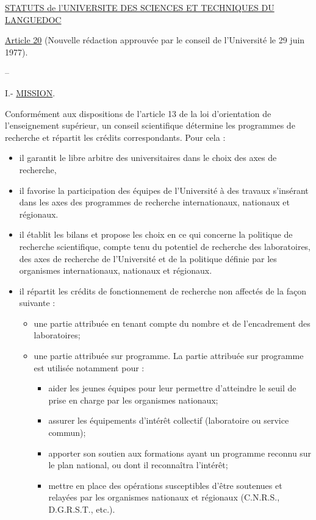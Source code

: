 
\uline{STATUTS de l'UNIVERSITE DES SCIENCES ET TECHNIQUES DU LANGUEDOC}

\uline{Article 20} (Nouvelle rédaction approuvée par le conseil de l'Université le 29 juin 1977).

\begin{center}
--

\end{center}

I.- \uline{MISSION}.

Conformément aux dispositions de l'article 13 de la loi d'orientation de l'enseignement supérieur, un conseil scientifique détermine les programmes de recherche et répartit les crédits correspondants. Pour cela :
\begin{itemize}[label=-]
\item il garantit le libre arbitre des universitaires dans le choix des axes de recherche,
\item il favorise la participation des équipes de l'Université à des travaux s'insérant dans les axes des programmes de recherche internationaux, nationaux et régionaux.
\item il établit les bilans et propose les choix en ce qui concerne la politique de recherche scientifique, compte tenu du potentiel de recherche des laboratoires, des axes de recherche de l'Université et de la politique définie par les organismes internationaux, nationaux et régionaux.
\item il répartit les crédits de fonctionnement de recherche non affectés de la façon suivante :
\begin{itemize}[label=$\cdot$]
\item une partie attribuée en tenant compte du nombre et de l'encadrement des laboratoires;
\item une partie attribuée sur programme. La partie attribuée sur programme est utilisée notamment pour :
\begin{itemize}[label=-]
\item aider les jeunes équipes pour leur permettre d'atteindre le seuil de prise en charge par les organismes nationaux;
\item assurer les équipements d'intérêt collectif (laboratoire ou service commun);
\item apporter son soutien aux formations ayant un programme reconnu sur le plan national, ou dont il reconnaîtra l'intérêt;
\item mettre en place des opérations susceptibles d'être soutenues et relayées par les organismes nationaux et régionaux (C.N.R.S., D.G.R.S.T., etc.).
\end{itemize}
\end{itemize}
\end{itemize}

